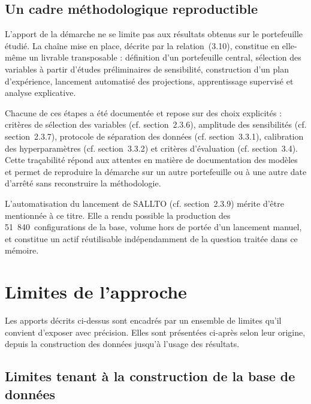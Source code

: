 \subsection{Un cadre méthodologique reproductible}

L'apport de la démarche ne se limite pas aux résultats obtenus sur le portefeuille étudié. La chaîne mise en place, décrite par la relation~(3.10), constitue en elle-même un livrable transposable : définition d'un portefeuille central, sélection des variables à partir d'études préliminaires de sensibilité, construction d'un plan d'expérience, lancement automatisé des projections, apprentissage supervisé et analyse explicative.

Chacune de ces étapes a été documentée et repose sur des choix explicités : critères de sélection des variables (cf. section~2.3.6), amplitude des sensibilités (cf. section~2.3.7), protocole de séparation des données (cf. section~3.3.1), calibration des hyperparamètres (cf. section~3.3.2) et critères d'évaluation (cf. section~3.4). Cette traçabilité répond aux attentes en matière de documentation des modèles et permet de reproduire la démarche sur un autre portefeuille ou à une autre date d'arrêté sans reconstruire la méthodologie.

L'automatisation du lancement de SALLTO (cf. section~2.3.9) mérite d'être mentionnée à ce titre. Elle a rendu possible la production des 51~840~configurations de la base, volume hors de portée d'un lancement manuel, et constitue un actif réutilisable indépendamment de la question traitée dans ce mémoire.

\section{Limites de l'approche}

Les apports décrits ci-dessus sont encadrés par un ensemble de limites qu'il convient d'exposer avec précision. Elles sont présentées ci-après selon leur origine, depuis la construction des données jusqu'à l'usage des résultats.

\subsection{Limites tenant à la construction de la base de données}

